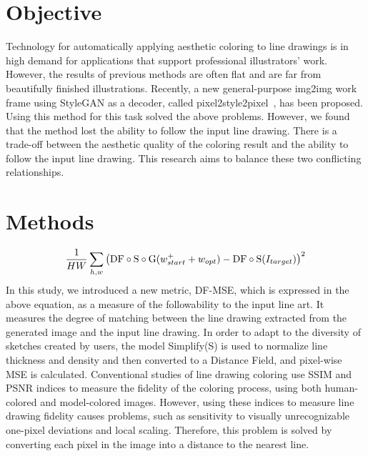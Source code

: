 \documentclass[a4paper]{article}
\newcommand{\aftersection}{\vspace{-5pt}}
\newcommand{\beforesection}{\vspace{-10pt}}
\begin{document}
\vspace{-20pt}
\begin{multicols}{2}
\section*{Objective}
\aftersection
Technology for automatically applying aesthetic coloring to line drawings is in high demand for applications that support professional illustrators' work. 
However, the results of previous methods are often flat and are far from beautifully finished illustrations.
Recently, a new general-purpose img2img work frame using StyleGAN as a decoder, called pixel2style2pixel~\cite{psp}, has been proposed. Using this method for this task solved the above problems. However, we found that the method lost the ability to follow the input line drawing. There is a trade-off between the aesthetic quality of the coloring result and the ability to follow the input line drawing.
This research aims to balance these two conflicting relationships.

\beforesection
\section*{Methods}
\aftersection
\vspace{-15pt}

\small
\begin{align*}
\frac{1}{HW}\sum_{h,w}\left({\rm DF \circ S\circ G}(w^+_{start}+w_{opt})-{\rm DF \circ S}(I_{target})\right)^2
\end{align*}
\normalsize
In this study, we introduced a new metric, DF-MSE, which is expressed in the above equation, as a measure of the followability to the input line art. It measures the degree of matching between the line drawing extracted from the generated image and the input line drawing. In order to adapt to the diversity of sketches created by users, the model Simplify(S) is used to normalize line thickness and density and then converted to a Distance Field, and pixel-wise MSE is calculated. Conventional studies of line drawing coloring use SSIM and PSNR indices to measure the fidelity of the coloring process, using both human-colored and model-colored images. However, using these indices to measure line drawing fidelity causes problems, such as sensitivity to visually unrecognizable one-pixel deviations and local scaling. Therefore, this problem is solved by converting each pixel in the image into a distance to the nearest line.


\end{multicols}
\end{document}
